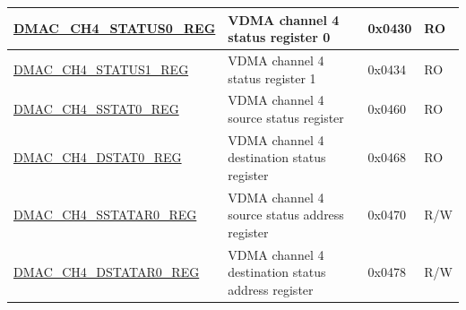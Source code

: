 \begin{longtable}{ | L{7.8cm} | L{6cm} | l | l | }
\hyperref[regdesc:DMACCHNSTATUS0REG]{DMAC\_CH4\_STATUS0\_REG} & VDMA channel 4 status register 0 & 0x0430 & RO \\ \hline
\hyperref[regdesc:DMACCHNSTATUS1REG]{DMAC\_CH4\_STATUS1\_REG} & VDMA channel 4 status register 1 & 0x0434 & RO \\ \hline
\hyperref[regdesc:DMACCHNSSTAT0REG]{DMAC\_CH4\_SSTAT0\_REG} & VDMA channel 4 source status register & 0x0460 & RO \\ \hline
\hyperref[regdesc:DMACCHNDSTAT0REG]{DMAC\_CH4\_DSTAT0\_REG} & VDMA channel 4 destination status register & 0x0468 & RO \\ \hline
\hyperref[regdesc:DMACCHNSSTATAR0REG]{DMAC\_CH4\_SSTATAR0\_REG} & VDMA channel 4 source status address register & 0x0470 & R/W \\ \hline
\hyperref[regdesc:DMACCHNDSTATAR0REG]{DMAC\_CH4\_DSTATAR0\_REG} & VDMA channel 4 destination status address register & 0x0478 & R/W \\ \hline

\end{longtable}
